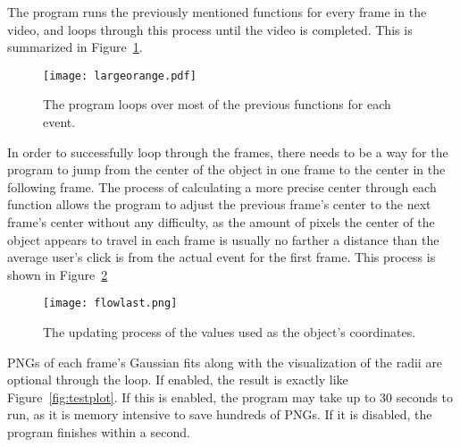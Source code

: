 The program runs the previously mentioned functions for every frame in the video, and loops through this process until the video is completed. This is summarized in Figure~\ref{fig:moreflow}.
\begin{figure}[ht!]
	\centering
	\texttt{[image: largeorange.pdf]}
	\caption{The program loops over most of the previous functions for each event.}
	\label{fig:moreflow}
\end{figure}

In order to successfully loop through the frames, there needs to be a way for the program to jump from the center of the object in one frame to the center in the following frame. The process of calculating a more precise center through each function allows the program to adjust the previous frame's center to the next frame's center without any difficulty, as the amount of pixels the center of the object appears to travel in each frame is usually no farther a distance than the average user's click is from the actual event for the first frame. This process is shown in Figure~\ref{fig:updatingxy}
\begin{figure}[htpb]
	\centering
	\texttt{[image: flowlast.png]}
	\caption{The updating process of the values used as the object's coordinates.}
	\label{fig:updatingxy}
\end{figure}

PNGs of each frame's Gaussian fits along with the visualization of the radii are optional through the loop. If enabled, the result is exactly like Figure~\ref{fig:testplot}. If this is enabled, the program may take up to 30 seconds to run, as it is memory intensive to save hundreds of PNGs. If it is disabled, the program finishes within a second.




